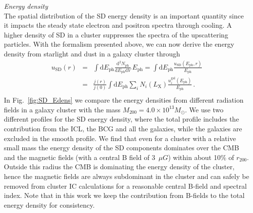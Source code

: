 \documentclass[10pt,aps,pra,reprint,amsmath,amsfonts,amssymb,showpacs]{revtex4-1}
\newcommand{\rmn}{\mathrm}
\newcommand{\ph}{\rmn{ph}}
\newcommand{\eph}{E_\ph}
\newcommand{\gal}{\rmn{gal}}
\newcommand{\sd}{\rmn{SD}}
\newcommand{\msun}{M_\odot}
\newcommand{\lx}{L_\rmn{X}}
\newcommand{\dd}{\rmn{d}}
\newcommand{\rvir}{r_{200}}
\newcommand{\mvir}{M_{200}}
\begin{document}
{\it Energy density}\\ The spatial distribution of the SD energy
density is an important quantity since it impacts the steady state
electron and positron spectra through cooling. A higher density of SD
in a cluster suppresses the spectra of the upscattering particles. With
the formalism presented above, we can now derive the energy density
from starlight and dust in a galaxy cluster through
\begin{eqnarray}
\label{eq:U_SD}
u_\sd(r) &=& \int \dd \eph \frac{\dd^2 N_\ph}{\dd \eph \dd V}\,\eph
=\int \dd \eph \frac{u_\sd(\eph, r)}{\eph}
\nonumber \\
&=&  \frac{j(r)}{j(0)}  \int \dd \eph \sum_i 
N_i(\lx) \frac{u_i^\gal(\eph)}{\eph}\,. \nonumber \\
\end{eqnarray}
In Fig.~\ref{fig:SD_Edens} we compare the energy densities from
different radiation fields in a galaxy cluster with the mass
$\mvir=4.0\times10^{13}\msun$. We use two different profiles for the
SD energy density, where the total profile includes the contribution
from the ICL, the BCG and all the galaxies, while the galaxies are
excluded in the smooth profile. We find that even for a cluster with a
relative small mass the energy density of the SD components dominates
over the CMB and the magnetic fields (with a central B field of 3~$\mu
G$) within about 10\% of $\rvir$. Outside this radius the CMB is
dominating the energy density of the cluster, hence the magnetic
fields are always subdominant in the cluster and can safely be removed
from cluster IC calculations for a reasonable central B-field and
spectral index. Note that in this work we keep the contribution
from B-fields to the total energy density for consistency.
\end{document}
